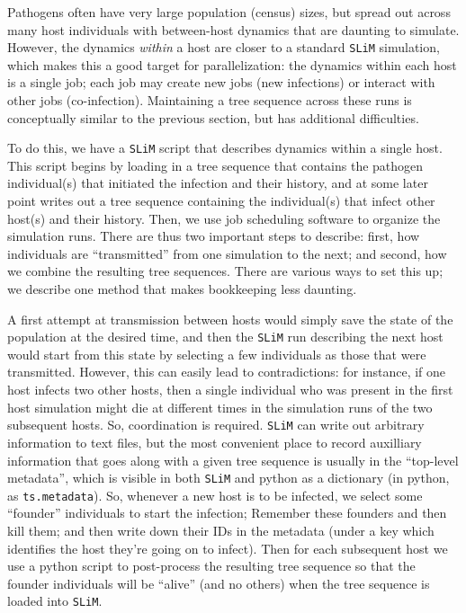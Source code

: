 \documentclass[12pt]{article}
\newcommand{\slim}[0]{\texttt{SLiM}\xspace}
\begin{document}
Pathogens often have very large population (census) sizes,
but spread out across many host individuals with between-host dynamics
that are daunting to simulate.
However, the dynamics \emph{within} a host are closer to a standard \slim simulation,
which makes this a good target for parallelization:
the dynamics within each host is a single job;
each job may create new jobs (new infections)
or interact with other jobs (co-infection).
Maintaining a tree sequence across these runs is conceptually similar
to the previous section, but has additional difficulties.

To do this, we have a \slim script that describes dynamics within a single host.
This script begins by loading in a tree sequence
that contains the pathogen individual(s) that initiated the infection and their history,
and at some later point writes out a tree sequence containing the individual(s) that infect other host(s)
and their history.
Then, we use job scheduling software to organize the simulation runs.
There are thus two important steps to describe:
first, how individuals are ``transmitted'' from one simulation to the next;
and second, how we combine the resulting tree sequences.
There are various ways to set this up; we describe one method that makes bookkeeping
less daunting.

A first attempt at transmission between hosts would simply save the state of the population
at the desired time, and then the \slim run describing the next host
would start from this state by selecting a few individuals as those that were transmitted.
However, this can easily lead to contradictions: for instance,
if one host infects two other hosts,
then a single individual who was present in the first host simulation
might die at different times in the simulation runs of the two subsequent hosts.
So, coordination is required.
\slim can write out arbitrary information to text files,
but the most convenient place to record auxilliary information that goes along with a given tree sequence
is usually in the ``top-level metadata'',
which is visible in both \slim and python as a dictionary
(in python, as \verb|ts.metadata|).
So, whenever a new host is to be infected,
we select some ``founder'' individuals to start the infection;
Remember these founders and then kill them;
and then write down their IDs in the metadata
(under a key which identifies the host they're going on to infect).
Then for each subsequent host
we use a python script to post-process the resulting tree sequence
so that the founder individuals will be ``alive'' (and no others)
when the tree sequence is loaded into \slim.
\end{document}
